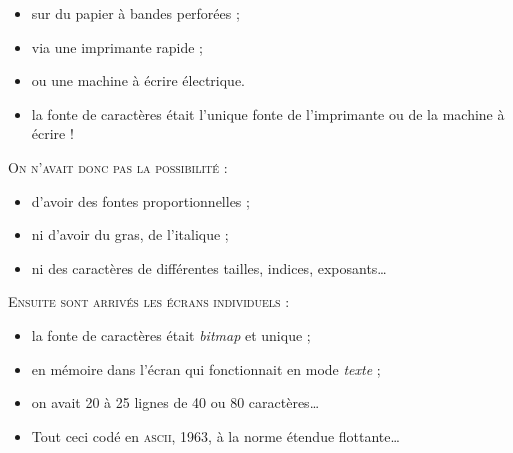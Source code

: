 \documentclass[12pt,a4paper,twocolumn]{book} %
\begin{document}
\begin{itemize}
\item  sur du papier à bandes perforées ;
\item  via une imprimante rapide ;
\item  ou une machine à écrire électrique.
\item  la fonte de caractères était l'unique fonte de l'imprimante ou de la machine à écrire !
\end{itemize}
    {\textsc{On n'avait donc pas la possibilité :}}
    \begin{itemize}
    \item d'avoir des fontes proportionnelles ;
    \item ni d'avoir du gras, de l'italique ;
    \item ni des caractères de différentes tailles, indices, exposants\dots
    \end{itemize}
        {\textsc{Ensuite sont arrivés les écrans individuels :}}
	\begin{itemize}
	\item la fonte de caractères était \textit{bitmap} et unique ;
	\item en mémoire dans l'écran qui fonctionnait en mode \textit{texte} ;
	\item on avait 20 à 25 lignes de 40 ou 80 caractères\dots
	\item Tout ceci codé en \textsc{ascii}, 1963, à la norme étendue flottante\dots
	\end{itemize}
\end{document}
